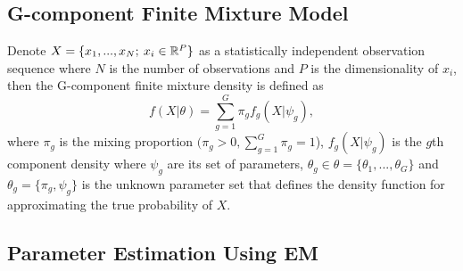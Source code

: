 \subsection{G-component Finite Mixture Model}
\label{sec:gcomponentmixturedensity}
Denote \(X=\{x_1, ..., x_N; \: x_i \in \mathbb{R}^P\}\) as a statistically independent observation sequence where \(N\) is the number of observations and \(P\) is the dimensionality of \(x_i\), then the G-component finite mixture density is defined as 
\[
    f(X|\theta) = \sum_{g=1}^{G} \pi_g f_g(X|\psi_g),
\]
where \(\pi_g\) is the mixing proportion \((\pi_g > 0, \sum_{g=1}^{G} \pi_g=1\)), \(f_g(X|\psi_g)\) is the \(g\)th component density where \(\psi_g\) are its set of parameters, \(\theta_g \in \theta=\{\theta_1, ..., \theta_G\}\) and \(\theta_g=\{\pi_g,\psi_g\}\) is the unknown parameter set that defines the density function for approximating the true probability of \(X\).

\subsection{Parameter Estimation Using EM}
\label{sec:em}
    
    
